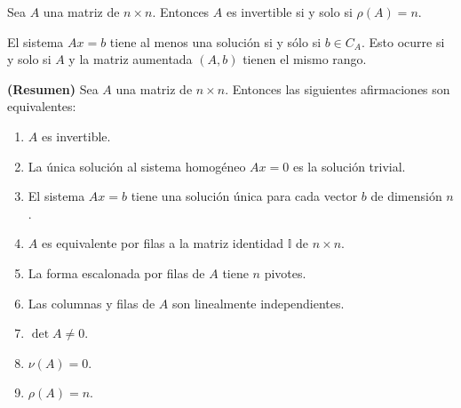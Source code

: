 \begin{thm}
Sea $A$ una matriz de $n \times n$. Entonces $A$ es invertible si y solo si $\rho (A) = n$.
\end{thm}

\begin{thm}
El sistema $Ax = b$ tiene al menos una solución si y sólo si $b \in C_A$. Esto ocurre si y solo si $A$ y la matriz aumentada $(A,b)$ tienen el mismo rango.
\end{thm}





\begin{thm}
\textbf{(Resumen)} Sea $A$ una matriz de $n \times n$. Entonces las siguientes afirmaciones son equivalentes:

\begin{enumerate}
\item
$A$ es invertible.

\item
La única solución al sistema homogéneo $Ax = 0$ es la solución trivial.

\item
El sistema $Ax = b$ tiene una solución única para cada vector $b$ de dimensión $n$.

\item
$A$ es equivalente por filas a la matriz identidad $\mathbb{I}$ de $n \times n$.

\item
La forma escalonada por filas de $A$ tiene $n$ pivotes.

\item
Las columnas y filas de $A$ son linealmente independientes.

\item
$\det A \not=0$.

\item
$\nu(A) = 0$.

\item
$\rho(A) = n$.
\end{enumerate}
\end{thm}









